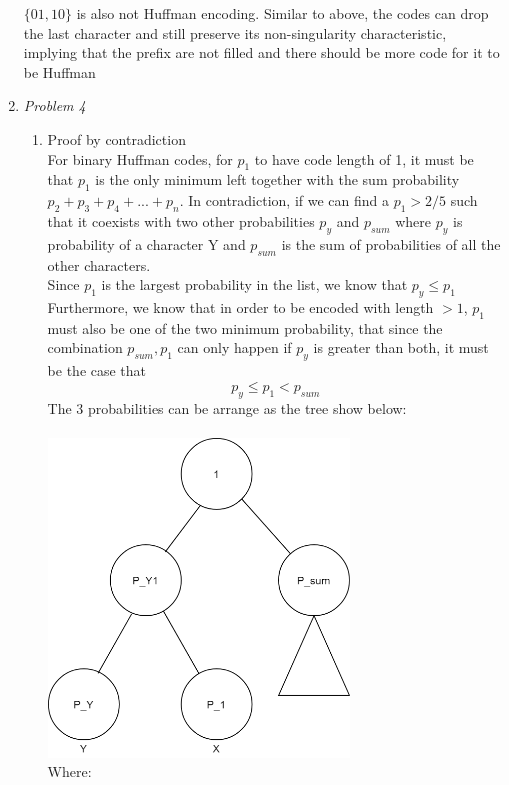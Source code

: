 \documentclass[12pt]{article}
\begin{document}
\begin{enumerate}
    $\{01,10\}$ is also not Huffman encoding. Similar to above, the codes can drop the last character and still preserve its non-singularity characteristic, implying that the prefix are not filled and there should be more code for it to be Huffman
    \item\textit{Problem 4}
    \begin{enumerate}
        \item Proof by contradiction\\
        For binary Huffman codes, for $p_1$ to have code length of 1, it must be that $p_1$ is the only minimum left together with the sum probability $p_2 + p_3 + p_4 + ... + p_n$.
        In contradiction, if we can find a $p_1 > 2/5$ such that it coexists with two other probabilities $p_y$ and $p_{sum}$ where $p_y$ is probability of a character Y and $p_{sum}$ is the sum of probabilities of all the other characters.\\
        Since $p_1$ is the largest probability in the list, we know that $p_y \leq p_1$\\ Furthermore, we know that in order to be encoded with length $> 1$, $p_1$ must also be one of the two minimum probability, that since the combination $p_{sum}, p_1$ can only happen if $p_y$ is greater than both, it must be the case that
        \begin{equation*}
            p_y \leq p_1 < p_{sum}
        \end{equation*}
        The 3 probabilities can be arrange as the tree show below:\\
        \\
        \noindent
        \includegraphics[width=8cm]{HW2-Q4-1.png}
        \noindent
        \\
        Where:

\end{enumerate}
\end{enumerate}
\end{document}
